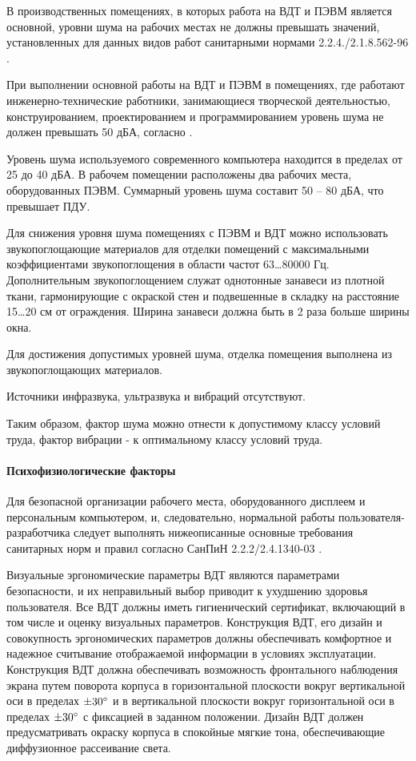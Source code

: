 В производственных помещениях, в которых работа на ВДТ и ПЭВМ является основной,
уровни шума на рабочих местах не должны превышать значений, установленных для
данных видов работ санитарными нормами 2.2.4./2.1.8.562-96
\cite{ecology_sanitary_norm_562_96}.

При выполнении основной работы на ВДТ и ПЭВМ в помещениях, где работают
инженерно-технические работники, занимающиеся творческой деятельностью, конструированием,
проектированием и программированием уровень шума не должен превышать 50 дБА,
согласно \cite[табл. 2]{ecology_sanitary_norm_562_96}.

Уровень шума используемого современного компьютера находится в пределах от 25 до
40 дБА. В рабочем помещении расположены два рабочих места, оборудованных ПЭВМ.
Суммарный уровень шума составит 50 – 80 дБА, что превышает ПДУ.

Для снижения уровня шума помещениях с ПЭВМ и ВДТ можно использовать звукопоглощающие
материалов для отделки помещений с максимальными коэффициентами звукопоглощения
в области частот 63…80000 Гц. Дополнительным звукопоглощением служат однотонные
занавеси из плотной ткани, гармонирующие с окраской стен и подвешенные в складку
на расстояние 15…20 см от ограждения. Ширина занавеси должна быть в 2 раза больше
ширины окна.

Для достижения допустимых уровней шума, отделка помещения выполнена из
звукопоглощающих материалов.

Источники инфразвука, ультразвука и вибраций отсутствуют.

Таким образом, фактор шума можно отнести к допустимому классу условий труда,
фактор вибрации - к оптимальному классу условий труда.

\paragraph{Психофизиологические факторы}

Для безопасной организации рабочего места, оборудованного дисплеем и персональным
компьютером, и, следовательно, нормальной работы пользователя-разработчика следует
выполнять нижеописанные основные требования санитарных норм и правил согласно
СанПиН 2.2.2/2.4.1340-03 \cite{ecology_sanpin_1340_03}.

Визуальные эргономические параметры ВДТ являются параметрами безопасности,
и их неправильный выбор приводит к ухудшению здоровья пользователя. Все ВДТ
должны иметь гигиенический сертификат, включающий в том числе и оценку визуальных
параметров. Конструкция ВДТ, его дизайн и совокупность эргономических параметров
должны обеспечивать комфортное и надежное считывание отображаемой информации в
условиях эксплуатации. Конструкция ВДТ должна обеспечивать возможность фронтального
наблюдения экрана путем поворота корпуса в горизонтальной плоскости вокруг
вертикальной оси в пределах $\pm 30 \degree$ и в вертикальной плоскости вокруг
горизонтальной оси в пределах $\pm 30 \degree$ с фиксацией в заданном положении.
Дизайн ВДТ должен предусматривать окраску корпуса в спокойные мягкие тона,
обеспечивающие диффузионное рассеивание света.


